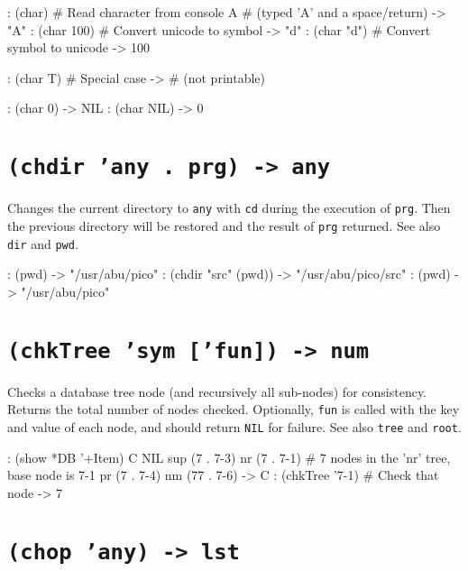 \begin{wideverbatim}
: (char)                   # Read character from console
A                          # (typed 'A' and a space/return)
-> "A"
: (char 100)               # Convert unicode to symbol
-> "d"
: (char "d")               # Convert symbol to unicode
-> 100

: (char T)                 # Special case
-> # (not printable)

: (char 0)
-> NIL
: (char NIL)
-> 0
\end{wideverbatim}

 
\section*{\texttt{(chdir 'any . prg) -> any}}
\label{sec:funct-rec-C-(chdir-'any-.-prg)-->-any}


Changes the current directory to \texttt{any} with \texttt{cd} during the execution of
\texttt{prg}. Then the previous directory will be restored and the result of
\texttt{prg} returned. See also \texttt{dir} and \texttt{pwd}.


\begin{wideverbatim}
: (pwd)
-> "/usr/abu/pico"
: (chdir "src" (pwd))
-> "/usr/abu/pico/src"
: (pwd)
-> "/usr/abu/pico"
\end{wideverbatim}

 
\section*{\texttt{(chkTree 'sym ['fun]) -> num}}
\label{sec:funct-rec-C-(chktree-'sym-['fun])-->-num}


Checks a database tree node (and recursively all sub-nodes) for
consistency. Returns the total number of nodes checked. Optionally,
\texttt{fun} is called with the key and value of each node, and should return
\texttt{NIL} for failure. See also \texttt{tree} and \texttt{root}.


\begin{wideverbatim}
: (show *DB '+Item)
{C} NIL
   sup (7 . {7-3})
   nr (7 . {7-1})    # 7 nodes in the 'nr' tree, base node is {7-1}
   pr (7 . {7-4})
   nm (77 . {7-6})
-> {C}
: (chkTree '{7-1})   # Check that node
-> 7
\end{wideverbatim}

 
\section*{\texttt{(chop 'any) -> lst}}
\label{sec:funct-rec-C-(chop-'any)-->-lst}


